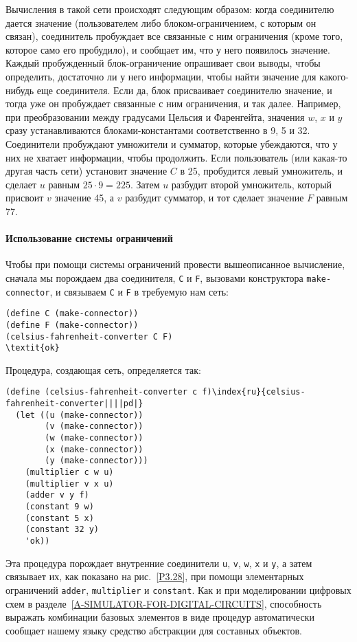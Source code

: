 Вычисления в такой сети происходят следующим образом: когда соединителю
дается значение (пользователем либо блоком-ограничением, с которым он
связан), соединитель пробуждает все связанные с ним ограничения (кроме
того, которое само его пробудило), и сообщает им, что у него появилось
значение.  Каждый пробужденный блок-ограничение опрашивает свои
выводы, чтобы определить, достаточно ли у него информации, чтобы найти
значение для какого-нибудь еще соединителя. Если да, блок присваивает соединителю
значение, и тогда уже он пробуждает связанные с ним ограничения, и так
далее. Например, при преобразовании между градусами Цельсия и
Фаренгейта, значения $w$, $x$ и $y$
сразу устанавливаются блоками-константами соответственно в 9, 5 и 32.
Соединители пробуждают умножители и сумматор, которые убеждаются, что
у них не хватает информации, чтобы продолжить.  Если пользователь (или
какая-то другая часть сети) установит значение $C$ в 25,
пробудится левый умножитель, и сделает $u$ равным
$25 \cdot 9 = 225$. Затем $u$ разбудит второй
умножитель, который присвоит $v$ значение 45, а
$v$ разбудит сумматор, и тот сделает значение
$F$ равным 77.

\paragraph{Использование системы ограничений}


Чтобы при помощи системы ограничений провести
вышеописанное вычисление, сначала мы порождаем два соединителя,
{\tt C} и {\tt F}, вызовами конструктора
{\tt make-connector}, и связываем {\tt C} и
{\tt F} в требуемую нам сеть:

\begin{Verbatim}[fontsize=\small]
(define C (make-connector))
(define F (make-connector))
(celsius-fahrenheit-converter C F)
\textit{ok}
\end{Verbatim}
Процедура, создающая сеть, определяется так:

\begin{Verbatim}[fontsize=\small]
(define (celsius-fahrenheit-converter c f)\index{ru}{celsius-fahrenheit-converter||||pd|}
  (let ((u (make-connector))
        (v (make-connector))
        (w (make-connector))
        (x (make-connector))
        (y (make-connector)))
    (multiplier c w u)
    (multiplier v x u)
    (adder v y f)
    (constant 9 w)
    (constant 5 x)
    (constant 32 y)
    'ok))
\end{Verbatim}
Эта процедура порождает внутренние соединители {\tt u},
{\tt v}, {\tt w}, {\tt x} и {\tt y}, а
затем связывает их, как показано на рис.~\ref{P3.28}, при
помощи элементарных ограничений {\tt adder},
{\tt multiplier} и {\tt constant}.  Как и
при моделировании цифровых схем в
разделе~\ref{A-SIMULATOR-FOR-DIGITAL-CIRCUITS}, способность
выражать комбинации базовых элементов в виде процедур автоматически
сообщает нашему языку средство абстракции для составных объектов.

